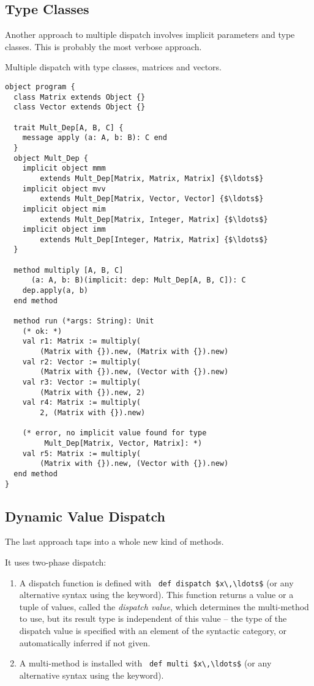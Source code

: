 \subsection{Type Classes}

Another approach to multiple dispatch involves implicit parameters and type classes. This is probably the most verbose approach. 

\example Multiple dispatch with type classes, matrices and vectors. 
\begin{lstlisting}
object program {
  class Matrix extends Object {}
  class Vector extends Object {}
  
  trait Mult_Dep[A, B, C] {
    message apply (a: A, b: B): C end
  }
  object Mult_Dep {
    implicit object mmm 
        extends Mult_Dep[Matrix, Matrix, Matrix] {$\ldots$}
    implicit object mvv 
        extends Mult_Dep[Matrix, Vector, Vector] {$\ldots$}
    implicit object mim 
        extends Mult_Dep[Matrix, Integer, Matrix] {$\ldots$}
    implicit object imm 
        extends Mult_Dep[Integer, Matrix, Matrix] {$\ldots$}
  }
  
  method multiply [A, B, C]
      (a: A, b: B)(implicit: dep: Mult_Dep[A, B, C]): C
    dep.apply(a, b)
  end method
  
  method run (*args: String): Unit
    (* ok: *)
    val r1: Matrix := multiply(
        (Matrix with {}).new, (Matrix with {}).new)
    val r2: Vector := multiply(
        (Matrix with {}).new, (Vector with {}).new)
    val r3: Vector := multiply(
        (Matrix with {}).new, 2)
    val r4: Matrix := multiply(
        2, (Matrix with {}).new)
    
    (* error, no implicit value found for type
         Mult_Dep[Matrix, Vector, Matrix]: *)
    val r5: Matrix := multiply(
        (Matrix with {}).new, (Vector with {}).new)
  end method
}
\end{lstlisting}





\subsection{Dynamic Value Dispatch}
\label{sec:dynamic-value-dispatch}

The last approach taps into a whole new kind of methods. 

It uses two-phase dispatch:
\begin{enumerate}
  \item A dispatch function is defined with ~\lstinline!def dispatch $x\,\ldots$! (or any alternative syntax using the  keyword). This function returns a value or a tuple of values, called the {\em dispatch value}, which determines the multi-method to use, but its result type is independent of this value -- the type of the dispatch value is specified with an element of the  syntactic category, or automatically inferred if not given. 
  \item A multi-method is installed with ~\lstinline!def multi $x\,\ldots$! (or any alternative syntax using the  keyword).
\end{enumerate}

